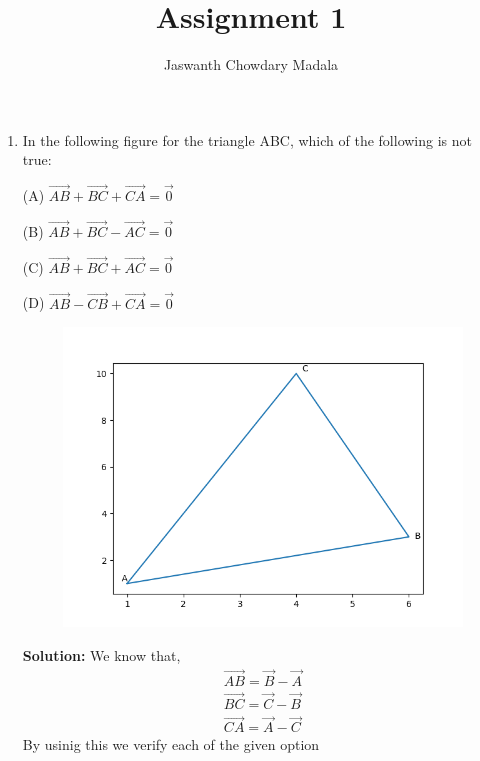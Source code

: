 \documentclass[journal,12pt,twocolumn]{IEEEtran}
\begin{document}
\vspace{3cm}


\title{Assignment 1}
\author{Jaswanth Chowdary Madala}





\maketitle

\newpage


\bigskip

\renewcommand{\thefigure}{\theenumi}
\renewcommand{\thetable}{\theenumi}

\begin{enumerate}
\item In the following figure for the triangle ABC, which of the following is not true:

(A) $\overrightarrow{AB}+\overrightarrow{BC}+\overrightarrow{CA} = \overrightarrow{0}$

(B) $\overrightarrow{AB}+\overrightarrow{BC}-\overrightarrow{AC} = \overrightarrow{0}$

(C) $\overrightarrow{AB}+\overrightarrow{BC}+\overrightarrow{AC} = \overrightarrow{0}$

(D) $\overrightarrow{AB}-\overrightarrow{CB}+\overrightarrow{CA} = \overrightarrow{0}$

\begin{figure}[h]
\centering
\includegraphics[width = \columnwidth]{./figs/fig1.png}
\caption{}
\end{figure}
\textbf{Solution:} We know that,
\begin{align}
\overrightarrow{AB} = \vec{B} - \vec{A}\\
\overrightarrow{BC} = \vec{C} - \vec{B}\\
\overrightarrow{CA} = \vec{A} - \vec{C}
\end{align}
By usinig this we verify each of the given option


\end{enumerate}
\end{document}
